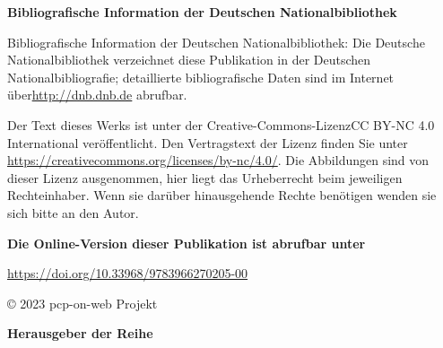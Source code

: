 \begin{flushleft}
\begin{FlushLeft}
\textbf{Bibliografische Information der Deutschen Nationalbibliothek}

Bibliografische Information der Deutschen Nationalbibliothek: Die Deutsche Nationalbibliothek verzeichnet diese Publikation in der Deutschen Nationalbibliografie; detaillierte bibliografische Daten sind im Internet über\linebreak \url{http://dnb.dnb.de} abrufbar.

\vspace{1em}

Der Text dieses Werks ist unter der Creative-Commons-Lizenz\linebreak CC BY-NC 4.0 International veröffentlicht. Den Vertragstext der Lizenz finden Sie unter \url{https://creativecommons.org/licenses/by-nc/4.0/}.
Die Abbildungen sind von dieser Lizenz ausgenommen, hier liegt das Urheberrecht beim jeweiligen Rechteinhaber.
Wenn sie darüber hinausgehende Rechte benötigen wenden sie sich bitte an den Autor.
\end{FlushLeft}


\textbf{Die Online-Version dieser Publikation ist abrufbar unter}

\url{https://doi.org/10.33968/9783966270205-00}

\vspace{1em}

© 2023 pcp-on-web Projekt

\vspace{1em}

\textbf{Herausgeber der Reihe}


\end{flushleft}
